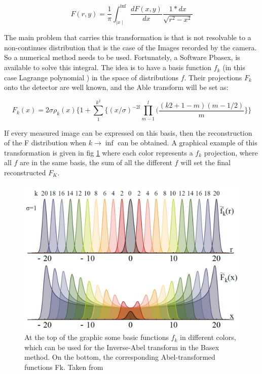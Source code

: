 \begin{equation}
F(r,y)=\dfrac{1}{\pi} \int^{\inf}_{\mid x\mid} \dfrac{dF(x,y)}{dx} \dfrac{1*dx}{\sqrt{r^{2}-x^{2}}} 
\end{equation}

The main problem that carries this transformation is that is not resolvable to a non-continues distribution that is the case of the Images recorded by the camera. So a numerical method needs to be used.
Fortunately, a Software Pbasex, is available to solve this integral. The idea is to have a basis function $f_{k}$ (in this case Lagrange polynomial ) in the space of distributions $f$.  Their projections $F_{k}$ onto the detector are well known, and the Able transform will be set as:

\begin{equation}
F_{k}(x) = 2\sigma \rho_{k}(x)\lbrace 1 + \sum^{k^{2}}_{1}\lbrace (x/\sigma)^{-2l} \prod^{l}_{m-1}(\dfrac{(k2+ 1-m)(m-1/2)}{m}\rbrace \rbrace
\end{equation}

If every measured image can be expressed on this basis, then the reconstruction of the F distribution when $k\rightarrow \inf$ can be obtained. A graphical example of this transformation is given in fig \ref{img:Abel} where each color represents a $f_{k}$ projection, where all $f$ are in the same basis, the sum of all the different $f$ will set the final reconstructed $F_{K}$.

\begin{figure}[h!]
\label{img:Abel}
 \caption{At the top of the graphic some basic functions $f_{k}$ in different colors, which can be used for the Inverse-Abel transform in the Basex method. On the bottom, the corresponding Abel-transformed functions Fk. Taken from \cite{fechner_lutz_aufbau_2011}}
 \centering
 \includegraphics[width=10 cm]{../Images/abel transform pbasex function.png}
 \end{figure}


